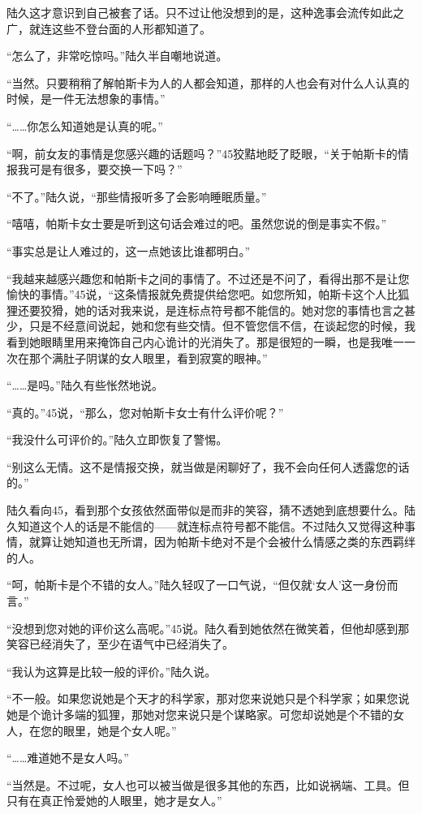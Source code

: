 陆久这才意识到自己被套了话。只不过让他没想到的是，这种逸事会流传如此之广，就连这些不登台面的人形都知道了。

“怎么了，非常吃惊吗。”陆久半自嘲地说道。

“当然。只要稍稍了解帕斯卡为人的人都会知道，那样的人也会有对什么人认真的时候，是一件无法想象的事情。”

“……你怎么知道她是认真的呢。”

“啊，前女友的事情是您感兴趣的话题吗？”45狡黠地眨了眨眼，“关于帕斯卡的情报我可是有很多，要交换一下吗？”

“不了。”陆久说，“那些情报听多了会影响睡眠质量。”

“嘻嘻，帕斯卡女士要是听到这句话会难过的吧。虽然您说的倒是事实不假。”

“事实总是让人难过的，这一点她该比谁都明白。”

“我越来越感兴趣您和帕斯卡之间的事情了。不过还是不问了，看得出那不是让您愉快的事情。”45说，“这条情报就免费提供给您吧。如您所知，帕斯卡这个人比狐狸还要狡猾，她的话对我来说，是连标点符号都不能信的。她对您的事情也言之甚少，只是不经意间说起，她和您有些交情。但不管您信不信，在谈起您的时候，我看到她眼睛里用来掩饰自己内心诡计的光消失了。那是很短的一瞬，也是我唯一一次在那个满肚子阴谋的女人眼里，看到寂寞的眼神。”

“……是吗。”陆久有些怅然地说。

“真的。”45说，“那么，您对帕斯卡女士有什么评价呢？”

“我没什么可评价的。”陆久立即恢复了警惕。

“别这么无情。这不是情报交换，就当做是闲聊好了，我不会向任何人透露您的话的。”

陆久看向45，看到那个女孩依然面带似是而非的笑容，猜不透她到底想要什么。陆久知道这个人的话是不能信的——就连标点符号都不能信。不过陆久又觉得这种事情，就算让她知道也无所谓，因为帕斯卡绝对不是个会被什么情感之类的东西羁绊的人。

“呵，帕斯卡是个不错的女人。”陆久轻叹了一口气说，“但仅就‘女人’这一身份而言。”

“没想到您对她的评价这么高呢。”45说。陆久看到她依然在微笑着，但他却感到那笑容已经消失了，至少在语气中已经消失了。

“我认为这算是比较一般的评价。”陆久说。

“不一般。如果您说她是个天才的科学家，那对您来说她只是个科学家；如果您说她是个诡计多端的狐狸，那她对您来说只是个谋略家。可您却说她是个不错的女人，在您的眼里，她是个女人呢。”

“……难道她不是女人吗。”

“当然是。不过呢，女人也可以被当做是很多其他的东西，比如说祸端、工具。但只有在真正怜爱她的人眼里，她才是女人。”

